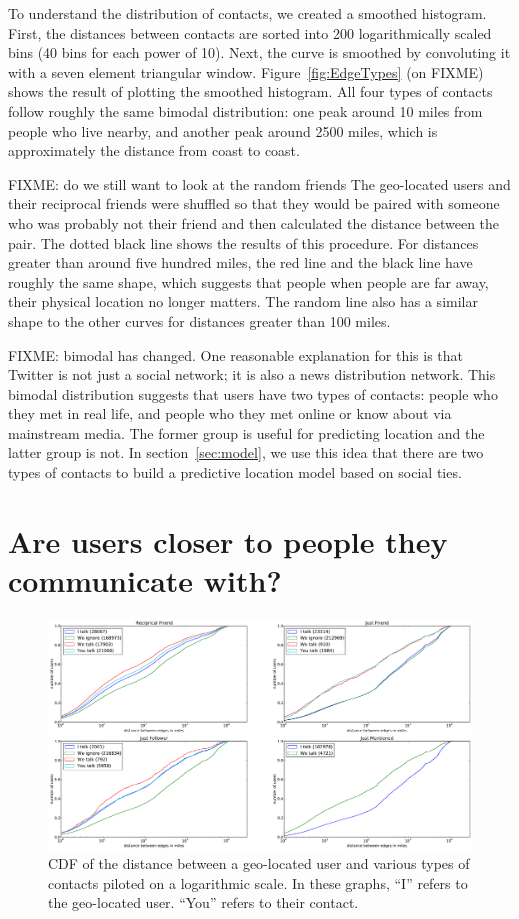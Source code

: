 To understand the distribution of contacts, we created a smoothed histogram.
First, the distances between contacts are sorted into 200 logarithmically
scaled bins (40 bins for each power of 10). Next, the curve is smoothed by
convoluting it with a seven element triangular window.
Figure~\ref{fig:EdgeTypes} (on FIXME) shows the result of plotting the
smoothed histogram.
All four types of contacts follow roughly the same bimodal
distribution: one peak around 10 miles from people who live nearby, and another
peak around 2500 miles, which is approximately the distance from coast to
coast.

FIXME: do we still want to look at the random friends
The geo-located users and their reciprocal friends were shuffled so that they
would be paired with someone who was probably not their friend and then
calculated the distance between the pair.
The dotted black line shows the results of this procedure.
For distances greater than around five
hundred miles, the red line and the black line have roughly the same shape,
which suggests that people when people are far away, their physical location no
longer matters.
The random line also has a similar shape to the other curves for distances
greater than 100 miles.

FIXME: bimodal has changed.
One reasonable explanation for this is that Twitter is not just a social
network; it is also a news distribution network.  This bimodal distribution
suggests that users have two types of contacts: people who they met in
real life, and people who they met online or know about via mainstream media.
The former group is useful for predicting location and the latter group is not.
In section~\ref{sec:model}, we use this idea that there are two types of
contacts to build a predictive location model based on social ties.


\section{Are users closer to people they communicate with?}

\begin{figure}[h]
\centering
\includegraphics[width=\linewidth]{figures/com_types.pdf}
\caption{
CDF of the distance between a geo-located user and various types of contacts piloted on a logarithmic scale.
In these graphs, ``I'' refers to the geo-located user. ``You'' refers to their contact.
}
\label{fig:ComTypes}
\end{figure}

